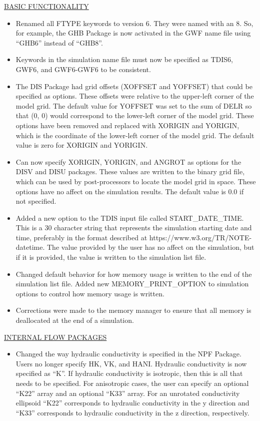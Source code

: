 \begin{itemize}
	\underline{BASIC FUNCTIONALITY}
	\begin{itemize}
		\item Renamed all FTYPE keywords to version 6.  They were named with an 8.  So, for example, the GHB Package is now activated in the GWF name file using ``GHB6'' instead of ``GHB8''.
		\item Keywords in the simulation name file must now be specified as TDIS6, GWF6, and GWF6-GWF6 to be consistent.
		\item The DIS Package had grid offsets (XOFFSET and YOFFSET) that could be specified as options.  These offsets were relative to the upper-left corner of the model grid.  The default value for YOFFSET was set to the sum of DELR so that (0, 0) would correspond to the lower-left corner of the model grid.  These options have been removed and replaced with XORIGIN and YORIGIN, which is the coordinate of the lower-left corner of the model grid.  The default value is zero for XORIGIN and YORIGIN.
		\item Can now specify XORIGIN, YORIGIN, and ANGROT as options for the DISV and DISU packages.  These values are written to the binary grid file, which can be used by post-processors to locate the model grid in space.  These options have no affect on the simulation results.  The default value is 0.0 if not specified.
		\item Added a new option to the TDIS input file called START\_DATE\_TIME.  This is a 30 character string that represents the simulation starting date and time, preferably in the format described at https://www.w3.org/TR/NOTE-datetime.  The value provided by the user has no affect on the simulation, but if it is provided, the value is written to the simulation list file.
		\item Changed default behavior for how memory usage is written to the end of the simulation list file.  Added new MEMORY\_PRINT\_OPTION to simulation options to control how memory usage is written.
		\item Corrections were made to the memory manager to ensure that all memory is deallocated at the end of a simulation.
	\end{itemize}
	
	\underline{INTERNAL FLOW PACKAGES}
	\begin{itemize}
		\item Changed the way hydraulic conductivity is specified in the NPF Package.  Users no longer specify HK, VK, and HANI.  Hydraulic conductivity is now specified as ``K''.  If hydraulic conductivity is isotropic, then this is all that needs to be specified.  For anisotropic cases, the user can specify an optional ``K22'' array and an optional ``K33'' array.  For an unrotated conductivity ellipsoid ``K22'' corresponds to hydraulic conductivity in the y direction and ``K33'' corresponds to hydraulic conductivity in the z direction, respectively.
	\end {itemize}
	

\end{itemize}
